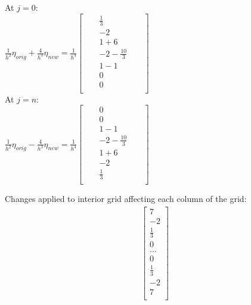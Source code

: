 \documentclass[12pt,letter]{article}
\begin{document}
\begin{enumerate}
\begin{enumerate}
    At $j=0$:\\
    
    $\frac{1}{h^2}\eta_{orig} + \frac{4}{h^3} \eta_{new}=
    \frac{1}{h^4}
    \begin{bmatrix}
      & & \frac{1}{3} & & \\
      & & -2 & &\\
      & & 1+6 & &\\
      & & -2-\frac{10}{3} & &\\
      & & 1-1 & & \\
      & & 0 & & \\
      & & 0 & & \\
    \end{bmatrix}
    $\\

    At $j=n$:\\
    
    $\frac{1}{h^2}\eta_{orig} - \frac{4}{h^3} \eta_{new}=
    \frac{1}{h^4}
    \begin{bmatrix}
      & & 0 & & \\
      & & 0 & & \\
      & & 1-1 & & \\
      & & -2-\frac{10}{3} & &\\
      & & 1+6 & &\\
      & & -2 & &\\
      & & \frac{1}{3} & & \\
    \end{bmatrix}
    $\\

    \pagebreak
    
    Changes applied to interior grid affecting each column of the grid:\\
    \begin{align*}
    \begin{bmatrix}
      7\\
      -2\\
      \frac{1}{3}\\
      0\\
      ...\\
      0\\
      \frac{1}{3}\\
      -2\\
      7\\
    \end{bmatrix}
    \end{align*}\\
    

\end{enumerate}
\end{enumerate}
\end{document}
